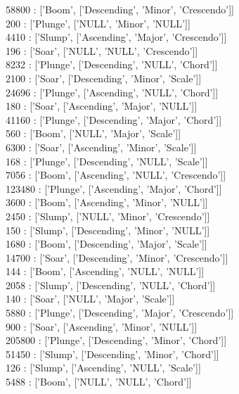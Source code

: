 {58800   :  ['Boom', ['Descending', 'Minor', 'Crescendo']]\\
200     :  ['Plunge', ['NULL', 'Minor', 'NULL']]\\
4410    :  ['Slump', ['Ascending', 'Major', 'Crescendo']]\\
196     :  ['Soar', ['NULL', 'NULL', 'Crescendo']]\\
8232    :  ['Plunge', ['Descending', 'NULL', 'Chord']]\\
2100    :  ['Soar', ['Descending', 'Minor', 'Scale']]\\
24696   :  ['Plunge', ['Ascending', 'NULL', 'Chord']]\\
180     :  ['Soar', ['Ascending', 'Major', 'NULL']]\\
41160   :  ['Plunge', ['Descending', 'Major', 'Chord']]\\
560     :  ['Boom', ['NULL', 'Major', 'Scale']]\\
6300    :  ['Soar', ['Ascending', 'Minor', 'Scale']]\\
168     :  ['Plunge', ['Descending', 'NULL', 'Scale']]\\
7056    :  ['Boom', ['Ascending', 'NULL', 'Crescendo']]\\
123480  :  ['Plunge', ['Ascending', 'Major', 'Chord']]\\
3600    :  ['Boom', ['Ascending', 'Minor', 'NULL']]\\
2450    :  ['Slump', ['NULL', 'Minor', 'Crescendo']]\\
150     :  ['Slump', ['Descending', 'Minor', 'NULL']]\\
1680    :  ['Boom', ['Descending', 'Major', 'Scale']]\\
14700   :  ['Soar', ['Descending', 'Minor', 'Crescendo']]\\
144     :  ['Boom', ['Ascending', 'NULL', 'NULL']]\\
2058    :  ['Slump', ['Descending', 'NULL', 'Chord']]\\
140     :  ['Soar', ['NULL', 'Major', 'Scale']]\\
5880    :  ['Plunge', ['Descending', 'Major', 'Crescendo']]\\
900     :  ['Soar', ['Ascending', 'Minor', 'NULL']]\\
205800  :  ['Plunge', ['Descending', 'Minor', 'Chord']]\\
51450   :  ['Slump', ['Descending', 'Minor', 'Chord']]\\
126     :  ['Slump', ['Ascending', 'NULL', 'Scale']]\\
5488    :  ['Boom', ['NULL', 'NULL', 'Chord']]\\
}
